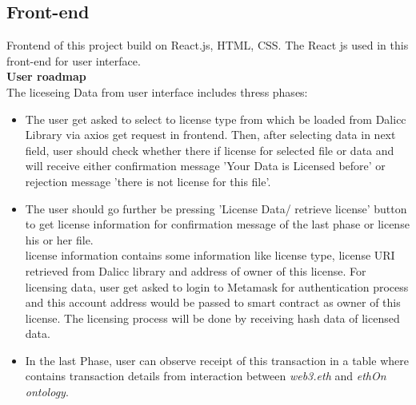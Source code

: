 \subsection{Front-end}
 Frontend of this project build on React.js, HTML, CSS. The React js used in this front-end for user interface.\\
 \textbf{User roadmap}\\
 The liceseing Data from user interface includes thress phases:
 \begin{itemize}
 	\item The user get asked to select to license type from which be loaded from Dalicc Library via axios get request in frontend. Then, after selecting data in next field, user should check whether there if license for selected file or data and will receive either confirmation message 'Your Data is Licensed before' or rejection message 'there is not license for this file'. 
 	\item The user should go further be pressing 'License Data/ retrieve license' button to get license information for confirmation message of the last phase or license his or her file.\\
 	license information contains some information like license type, license URI retrieved from Dalicc library and address of owner of this license. For licensing data, user get asked to login to Metamask for authentication process and this account address would be passed to smart contract as owner of this license. The licensing process will be done by receiving hash data of licensed data.
 	\item In the last Phase, user can observe receipt of this transaction in a table where contains transaction details from interaction between \textit{web3.eth} and \textit{ethOn ontology}.
 \end{itemize}
